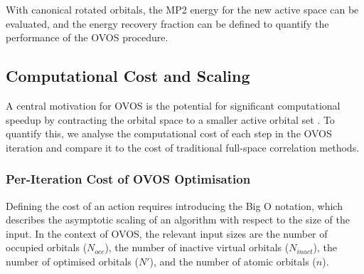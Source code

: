 With canonical rotated orbitals, the MP2 energy for the new active space can be evaluated, and the energy recovery fraction can be defined to quantify the performance of the OVOS procedure. 

\subsection{Computational Cost and Scaling}
\label{subsec:scaling}

A central motivation for OVOS is the potential for significant computational speedup by contracting the orbital space to a smaller active orbital set \cite{Adamowicz1987}. To quantify this, we analyse the computational cost of each step in the OVOS iteration and compare it to the cost of traditional full-space correlation methods.

\subsubsection{Per-Iteration Cost of OVOS Optimisation}

Defining the cost of an action requires introducing the Big O notation, which describes the asymptotic scaling of an algorithm with respect to the size of the input. In the context of OVOS, the relevant input sizes are the number of occupied orbitals ($N_{occ}$), the number of inactive virtual orbitals ($N_{inact}$), the number of optimised orbitals ($N'$), and the number of atomic orbitals ($n$).

